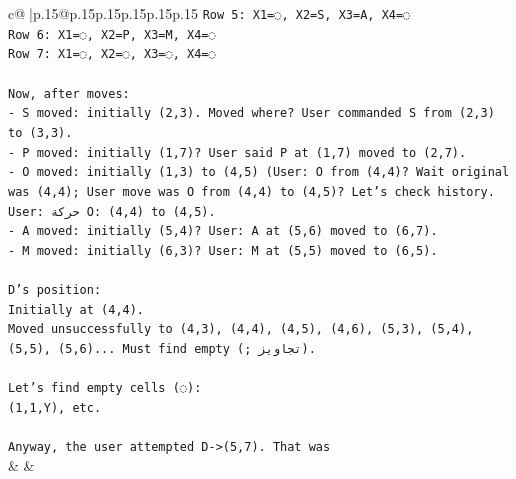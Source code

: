 \documentclass{article}
\begin{document}
{\begin{supertabular}{c@{$\;$}|p{.15\linewidth}@{}p{.15\linewidth}p{.15\linewidth}p{.15\linewidth}p{.15\linewidth}p{.15\linewidth}}
{{{\texttt{Row 5: X1=◌, X2=S, X3=A, X4=◌} \\
\texttt{Row 6: X1=◌, X2=P, X3=M, X4=◌} \\
\texttt{Row 7: X1=◌, X2=◌, X3=◌, X4=◌} \\
\\ 
\texttt{Now, after moves:} \\
\texttt{{-} S moved: initially (2,3). Moved where? User commanded S from (2,3) to (3,3).} \\
\texttt{{-} P moved: initially (1,7)? User said P at (1,7) moved to (2,7).} \\
\texttt{{-} O moved: initially (1,3) to (4,5) (User: O from (4,4)? Wait original was (4,4); User move was O from (4,4) to (4,5)? Let's check history.} \\
\texttt{User: حركة O: (4,4) to (4,5).} \\
\texttt{{-} A moved: initially (5,4)? User: A at (5,6) moved to (6,7).} \\
\texttt{{-} M moved: initially (6,3)? User: M at (5,5) moved to (6,5).} \\
\\ 
\texttt{D's position:} \\
\texttt{Initially at (4,4).} \\
\texttt{Moved unsuccessfully to (4,3), (4,4), (4,5), (4,6), (5,3), (5,4), (5,5), (5,6)... Must find empty (; تجاويز).} \\
\\ 
\texttt{Let's find empty cells (◌):} \\
\texttt{(1,1,Y), etc.} \\
\\ 
\texttt{Anyway, the user attempted D{-}>(5,7). That was} \\
            }
        }
    }
    & & \\ \\


\end{supertabular}}
\end{document}

